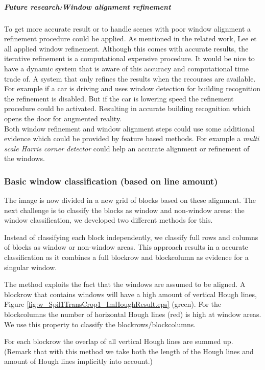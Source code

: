 \subparagraph{Future research:Window alignment refinement}
To get more accurate result or to handle scenes with poor window alignment a
refinement procedure could be applied.  As mentioned in the related work, Lee et
all \cite{Lee_extraction} applied window refinement.  Although this comes with
accurate results, the iterative refinement is a computational expensive
procedure.  It would be nice to have a dynamic system that is aware of this
accuracy and computational time trade of. A system that only refines the results
when the recourses are available.  For example if a car is driving and uses
window detection for building recognition the refinement is disabled.  But if
the car is lowering speed the refinement procedure could be activated.
Resulting in accurate building recognition which opens the door for augmented
reality.\\

Both window refinement and window alignment steps could use some additional
evidence which could be provided by feature based methods.  For example a
\emph{multi scale Harris corner detector} could help an accurate alignment or
refinement of the windows.








\subsubsection{Basic window classification (based on line amount)}
The image is now divided in a new grid of blocks based on these
alignment. The next challenge is to classify the blocks as window and
non-window areas: the window classification, we developed two different methods for this.

Instead of classifying each block independently, we classify full rows and
columns of blocks as window or non-window areas.  This approach results in a accurate
classification as it combines a full blockrow and blockcolumn as evidence for a singular
window. 

The method exploits the fact that the windows are assumed to be
aligned.
A blockrow that contains windows will have a high amount of vertical
Hough lines, Figure \ref{fig:w_Spil1TransCrop1_ImHoughResult.eps}
(green). For the blockcolumns the number of horizontal Hough lines
 (red) is high at window areas.  We use this property to classify 
 the blockrows/blockcolumns. 

For each blockrow the overlap of all vertical Hough lines are summed up.
(Remark that with this method we take both the length of the Hough lines and
amount of Hough lines implicitly into account.)

